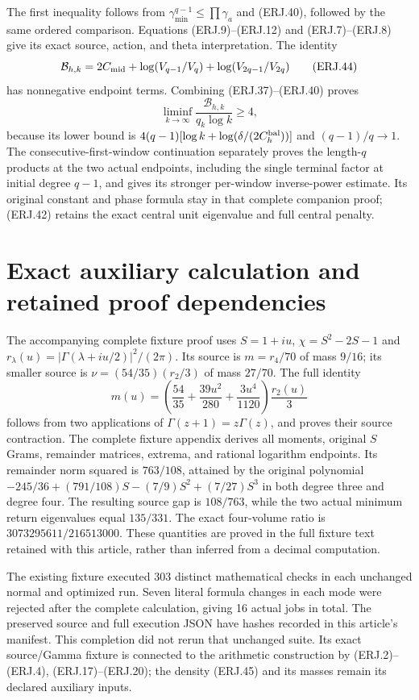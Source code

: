 \documentclass[11pt]{article}
\begin{document}
The first inequality follows from
$\gamma_{\min}^{q-1}\le\prod\gamma_a$ and (ERJ.40), followed
by the same ordered comparison. Equations (ERJ.9)--(ERJ.12) and
(ERJ.7)--(ERJ.8) give its exact source, action, and theta interpretation.
The identity
\[
 \mathcal B_{h,k}=2C_{\rm mid}
 +\log(V_{q-1}/V_q)+\log(V_{2q-1}/V_{2q})\tag{ERJ.44}
\]
has nonnegative endpoint terms. Combining (ERJ.37)--(ERJ.40) proves
\[
 \liminf_{k\to\infty}\frac{\mathcal B_{h,k}}{q_k\log k}\ge4,
\]
because its lower bound is
$4(q-1)[\log k+\log(\delta/(2C_h^{\rm bal}))]$ and
$(q-1)/q\to1$. The consecutive-first-window continuation separately
proves the length-$q$ products at the two actual endpoints, including
the single terminal factor at initial degree $q-1$, and gives its
stronger per-window inverse-power estimate. Its original constant and
phase formula stay in that complete companion proof; (ERJ.42) retains
the exact central unit eigenvalue and full central penalty.

\section{Exact auxiliary calculation and retained proof dependencies}
The accompanying complete fixture proof uses $S=1+iu$,
$\chi=S^2-2S-1$ and
$r_\lambda(u)=|\Gamma(\lambda+iu/2)|^2/(2\pi)$.
Its source is $m=r_4/70$ of mass $9/16$; its smaller source is
$\nu=(54/35)(r_2/3)$ of mass $27/70$. The full identity
\[
 m(u)=\left(\frac{54}{35}+\frac{39u^2}{280}
                  +\frac{3u^4}{1120}\right)\frac{r_2(u)}3
 \tag{ERJ.45}
\]
follows from two applications of $\Gamma(z+1)=z\Gamma(z)$,
and proves their source contraction. The complete fixture appendix
derives all moments, original $S$ Grams, remainder matrices, extrema,
and rational logarithm endpoints. Its remainder norm squared is
$763/108$, attained by the original polynomial
$-245/36+(791/108)S-(7/9)S^2+(7/27)S^3$ in both degree three
and degree four. The resulting source gap is $108/763$, while
the two actual minimum return eigenvalues equal $135/331$.
The exact four-volume ratio is $3073295611/216513000$.
These quantities are proved in the full fixture text retained with
this article, rather than inferred from a decimal computation.

The existing fixture executed 303 distinct mathematical checks in
each unchanged normal and optimized run. Seven literal formula changes
in each mode were rejected after the complete calculation, giving
16 actual jobs in total. The preserved source and full execution JSON
have hashes recorded in this article's manifest. This completion did
not rerun that unchanged suite. Its exact source/Gamma fixture is
connected to the arithmetic construction by (ERJ.2)--(ERJ.4),
(ERJ.17)--(ERJ.20); the density (ERJ.45) and its masses remain its
declared auxiliary inputs.
\end{document}

